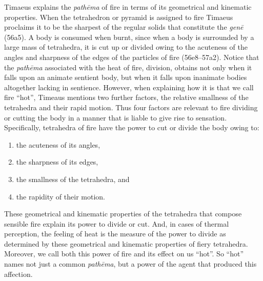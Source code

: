 Timaeus explains the \emph{pathēma} of fire in terms of its geometrical and kinematic properties. When the tetrahedron or pyramid is assigned to fire Timaeus proclaims it to be the sharpest of the regular solids that constitute the \emph{genē} (56a5). A body is consumed when burnt, since when a body is surrounded by a large mass of tetrahedra, it is cut up or divided owing to the acuteness of the angles and sharpness of the edges of the particles of fire (56e8--57a2). Notice that the \emph{pathēma} associated with the heat of fire, division, obtains not only when it falls upon an animate sentient body, but when it falls upon inanimate bodies altogether lacking in sentience. However, when explaining how it is that we call fire ``hot'', Timeaus mentions two further factors, the relative smallness of the tetrahedra and their rapid motion. Thus four factors are relevant to fire dividing or cutting the body in a manner that is liable to give rise to sensation. Specifically, tetrahedra of fire have the power to cut or divide the body owing to:
\begin{enumerate}[(1)]
	\item the acuteness of its angles,
	\item the sharpness of its edges,
	\item the smallness of the tetrahedra, and
	\item the rapidity of their motion.
\end{enumerate}
These geometrical and kinematic properties of the tetrahedra that compose sensible fire explain its power to divide or cut. And, in cases of thermal perception, the feeling of heat is the measure of the power to divide as determined by these geometrical and kinematic properties of fiery tetrahedra. Moreover, we call both this power of fire and its effect on us ``hot''. So ``hot'' names not just a common \emph{pathēma}, but a power of the agent that produced this affection. 

